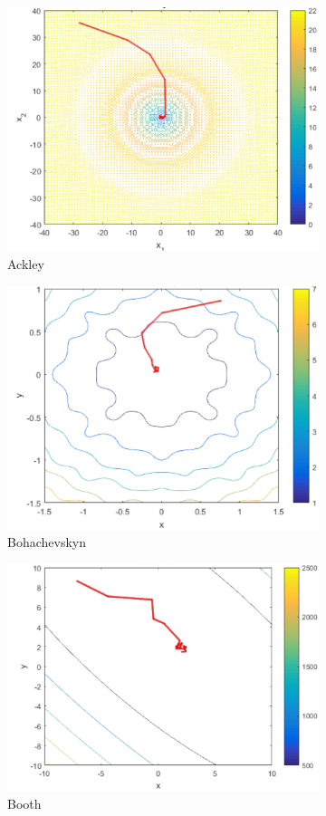 \documentclass[conference]{IEEEtran}
\begin{document}
\begin{figure}[htp]
\begin{subfigure}{.275\textwidth}
  \centering
  \includegraphics[width=.6\linewidth]{ackley.png}
  \caption{Ackley}
  \label{fig:figur:1}
\end{subfigure}%
\begin{subfigure}{.275\textwidth}
  \centering
  \includegraphics[width=.6\linewidth]{boha.png}
  \caption{Bohachevskyn}
  \label{fig:figur:2}
\end{subfigure}
\begin{subfigure}{.275\textwidth}
  \centering
  \includegraphics[width=.6\linewidth]{booth.png}
  \caption{Booth}
  \label{fig:figur:3}
\end{subfigure}%
\begin{subfigure}{.275\textwidth}

\end{subfigure}
\end{figure}
\end{document}
